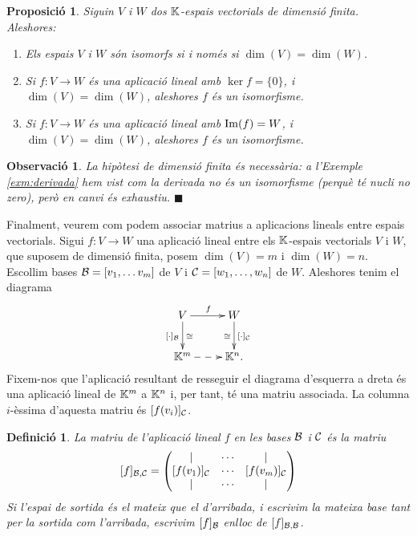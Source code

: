 \documentclass[
  11pt,
]{book}
\numberwithin{dummy}{section}
\theoremstyle{maincolornumbox}
\newtheorem{remarkT}{Observació}[chapter]
\theoremstyle{blacknumex}
\theoremstyle{blacknumbox}
\newtheorem{definitionT}{Definició}[chapter]
\theoremstyle{maincolornum}
\newtheorem{propositionT}{Proposició}[chapter]
\newenvironment{proposition}{\begin{pBox}\begin{propositionT}}{\end{propositionT}\end{pBox}}
\newenvironment{definition}{\begin{dBox}\begin{definitionT}}{\end{definitionT}\end{dBox}}
\newenvironment{remark}{\begin{remarkT}}{\hfill{\tiny\ensuremath{\blacksquare}}\end{remarkT}}
\newlength\esp
\begin{document}
\begin{proposition}

Siguin \(V\) i \(W\) dos \(\mathbb{K}\)-espais vectorials de dimensió finita.
Aleshores:

\begin{enumerate}
\def\labelenumi{\arabic{enumi}.}
\item
  Els espais \(V\) i \(W\) són isomorfs si i només si \(\dim(V)=\dim(W)\).
\item
  Si \(f\colon V\to W\) és una aplicació lineal amb \(\ker f=\{0\}\), i
  \(\dim(V)=\dim(W)\), aleshores \(f\) és un isomorfisme.
\item
  Si \(f\colon V\to W\) és una aplicació lineal amb \(\operatorname{Im}(f)=W\), i
  \(\dim(V)=\dim(W)\), aleshores \(f\) és un isomorfisme.
\end{enumerate}

\end{proposition}

\begin{remark}
La hipòtesi de dimensió finita és necessària: a
l'Exemple \ref{exm:derivada} hem vist com la derivada no és un
isomorfisme (perquè té nucli no zero), però en canvi és exhaustiu.
\end{remark}

Finalment, veurem com podem associar matrius a aplicacions lineals entre
espais vectorials. Sigui \(f\colon V\to W\) una aplicació lineal entre els
\(\mathbb{K}\)-espais vectorials \(V\) i \(W\), que suposem de dimensió finita, posem
\(\dim(V)=m\) i \(\dim(W)=n\). Escollim bases \(\mathcal{B}=[v_1,\ldots v_m]\) de
\(V\) i \(\mathcal{C}=[w_1,\ldots,w_n]\) de \(W\). Aleshores tenim el diagrama
\begin{align*}
\label{eq:diagrama-matriu-bases}
\xymatrix{
V\ar[r]^f\ar[d]^{\cong}_{[\cdot]_{\calb}} & W\ar[d]_{\cong}^{[\cdot]_{\calc}}\\
\K^m\ar@{-->}[r]&\K^n.
}
\end{align*} Fixem-nos que l'aplicació resultant de resseguir el
diagrama d'esquerra a dreta és una aplicació lineal de \(\mathbb{K}^m\) a \(\mathbb{K}^n\)
i, per tant, té una matriu associada. La columna \(i\)-èssima d'aquesta
matriu és \([f(v_i)]_{\mathcal{C}}\).

\begin{definition}
La \emph{matriu de l'aplicació lineal \(f\) en les bases \(\mathcal{B}\) i \(\mathcal{C}\)} és
la matriu \[[f]_{\mathcal{B},\mathcal{C}}=\begin{pmatrix}
\mid&\cdots&\mid\\
[f(v_1)]_{\mathcal{C}}&\cdots&[f(v_m)]_{\mathcal{C}}\\
\mid & \cdots &\mid
\end{pmatrix}\] Si l'espai de sortida és el mateix que el d'arribada, i
escrivim la mateixa base tant per la sortida com l'arribada, escrivim
\([f]_{\mathcal{B}}\) enlloc de \([f]_{\mathcal{B},\mathcal{B}}\).
\end{definition}
\end{document}
